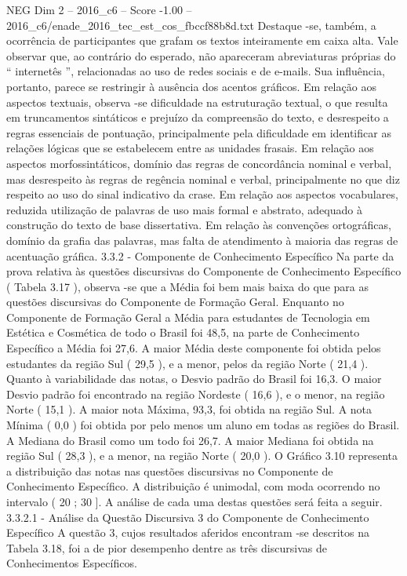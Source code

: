 \begin{textsample}{NEG Dim 2 – 2016\_c6 – Score -1.00 – 2016\_c6/enade\_2016\_tec\_est\_cos\_fbccf88b8d.txt}
Destaque -se, também, a ocorrência de participantes que grafam os textos inteiramente em caixa alta.
Vale observar que, ao contrário do esperado, não apareceram abreviaturas próprias do “ internetês ”, relacionadas ao uso de redes sociais e de e-mails.
Sua influência, portanto, parece se restringir à ausência dos acentos gráficos.
Em relação aos aspectos textuais, observa -se dificuldade na estruturação textual, o que resulta em truncamentos sintáticos e prejuízo da compreensão do texto, e desrespeito a regras essenciais de pontuação, principalmente pela dificuldade em identificar as relações lógicas que se estabelecem entre as unidades frasais.
Em relação aos aspectos morfossintáticos, domínio das regras de concordância nominal e verbal, mas desrespeito às regras de regência nominal e verbal, principalmente no que diz respeito ao uso do sinal indicativo da crase.
Em relação aos aspectos vocabulares, reduzida utilização de palavras de uso mais formal e abstrato, adequado à construção do texto de base dissertativa.
Em relação às convenções ortográficas, domínio da grafia das palavras, mas falta de atendimento à maioria das regras de acentuação gráfica. 3.3.2 - Componente de Conhecimento Específico Na parte da prova relativa às questões discursivas do Componente de Conhecimento Específico ( Tabela 3.17 ), observa -se que a Média foi bem mais baixa do que para as questões discursivas do Componente de Formação Geral.
Enquanto no Componente de Formação Geral a Média para estudantes de Tecnologia em Estética e Cosmética de todo o Brasil foi 48,5, na parte de Conhecimento Específico a Média foi 27,6.
A maior Média deste componente foi obtida pelos estudantes da região Sul ( 29,5 ), e a menor, pelos da região Norte ( 21,4 ).
Quanto à variabilidade das notas, o Desvio padrão do Brasil foi 16,3.
O maior Desvio padrão foi encontrado na região Nordeste ( 16,6 ), e o menor, na região Norte ( 15,1 ).
A maior nota Máxima, 93,3, foi obtida na região Sul.
A nota Mínima ( 0,0 ) foi obtida por pelo menos um aluno em todas as regiões do Brasil.
A Mediana do Brasil como um todo foi 26,7.
A maior Mediana foi obtida na região Sul ( 28,3 ), e a menor, na região Norte ( 20,0 ).
O Gráfico 3.10 representa a distribuição das notas nas questões discursivas no Componente de Conhecimento Específico.
A distribuição é unimodal, com moda ocorrendo no intervalo ( 20 ; 30 ].
A análise de cada uma destas questões será feita a seguir. 3.3.2.1 - Análise da Questão Discursiva 3 do Componente de Conhecimento Específico A questão 3, cujos resultados aferidos encontram -se descritos na Tabela 3.18, foi a de pior desempenho dentre as três discursivas de Conhecimentos Específicos.

\end{textsample}
